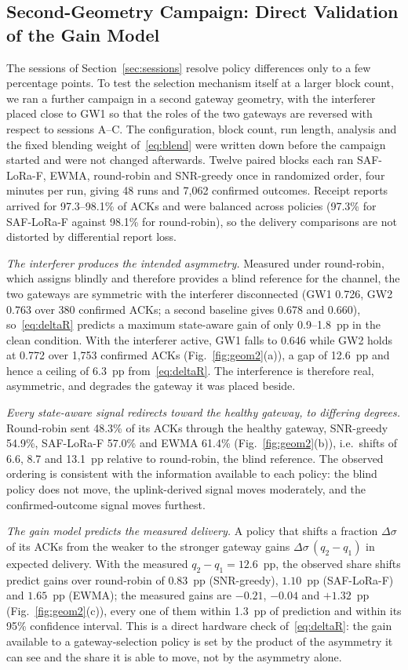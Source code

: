 \documentclass[journal]{IEEEtran}
\begin{document}
\subsection{Second-Geometry Campaign: Direct Validation of the Gain Model}
\label{sec:geom2}
The sessions of Section~\ref{sec:sessions} resolve policy differences only to a few
percentage points. To test the selection mechanism itself at a larger block count, we ran a
further campaign in a second gateway geometry, with the interferer placed close to GW1 so
that the roles of the two gateways are reversed with respect to sessions A--C. The
configuration, block count, run length, analysis and the fixed blending weight
of~\eqref{eq:blend} were written down before the campaign started and were not changed
afterwards. Twelve paired blocks each ran SAF-LoRa-F, EWMA, round-robin and SNR-greedy once
in randomized order, four minutes per run, giving 48 runs and 7{,}062 confirmed outcomes.
Receipt reports arrived for 97.3--98.1\% of ACKs and were balanced across policies
(97.3\% for SAF-LoRa-F against 98.1\% for round-robin), so the delivery comparisons are not
distorted by differential report loss.

\emph{The interferer produces the intended asymmetry.} Measured under round-robin, which
assigns blindly and therefore provides a blind reference for the channel, the two gateways are
symmetric with the interferer disconnected (GW1 0.726, GW2 0.763 over 380 confirmed ACKs;
a second baseline gives 0.678 and 0.660), so~\eqref{eq:deltaR} predicts a maximum
state-aware gain of only 0.9--1.8~pp in the clean condition. With the interferer active,
GW1 falls to 0.646 while GW2 holds at 0.772 over 1{,}753 confirmed ACKs
(Fig.~\ref{fig:geom2}(a)), a gap of 12.6~pp and hence a ceiling of 6.3~pp
from~\eqref{eq:deltaR}. The interference is therefore real, asymmetric, and degrades the
gateway it was placed beside.

\emph{Every state-aware signal redirects toward the healthy gateway, to differing degrees.} Round-robin sent 48.3\% of
its ACKs through the healthy gateway, SNR-greedy 54.9\%, SAF-LoRa-F 57.0\% and EWMA 61.4\%
(Fig.~\ref{fig:geom2}(b)), i.e.\ shifts of 6.6, 8.7 and 13.1~pp relative to round-robin, the
blind reference. The observed ordering is consistent with the information available to each
policy: the blind policy does not move, the uplink-derived signal moves moderately, and
the confirmed-outcome signal moves furthest.

\emph{The gain model predicts the measured delivery.} A policy that shifts a fraction
$\Delta\sigma$ of its ACKs from the weaker to the stronger gateway gains
$\Delta\sigma\,(q_2-q_1)$ in expected delivery. With the measured $q_2-q_1=12.6$~pp, the
observed share shifts predict gains over round-robin of $0.83$~pp (SNR-greedy), $1.10$~pp
(SAF-LoRa-F) and $1.65$~pp (EWMA); the measured gains are $-0.21$, $-0.04$ and $+1.32$~pp
(Fig.~\ref{fig:geom2}(c)), every one of them within 1.3~pp of prediction and within its 95\%
confidence interval. This is a direct hardware check of~\eqref{eq:deltaR}: the gain
available to a gateway-selection policy is set by the product of the asymmetry it can see
and the share it is able to move, not by the asymmetry alone.
\end{document}

